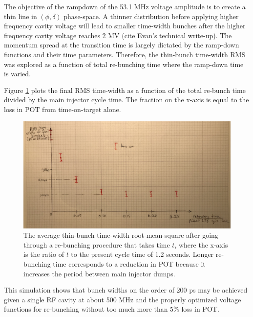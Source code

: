 The objective of the rampdown of the 53.1 MHz voltage amplitude is to
create a thin line in $(\phi, \delta)$ phase-space. A thinner
distribution before applying higher frequency cavity voltage will lead
to smaller time-width bunches after the higher frequency cavity
voltage reaches 2 MV (cite Evan's technical write-up). The momentum spread at the transition
time is largely dictated by the ramp-down functions and their time
parameters. Therefore, the thin-bunch time-width RMS was explored as a
function of total re-bunching time where the ramp-down time is varied.

Figure \ref{fig:bunch_width_curve} plots the final RMS time-width as a
function of the total re-bunch time divided by the main injector cycle
time. The fraction on the x-axis is equal to the loss in POT from
time-on-target alone.

\begin{figure}[h!]
	\begin{center}
        \includegraphics[width=0.60\linewidth]{Figures/draft_rms_vs_time.JPG}
	\end{center}
	\caption{The average thin-bunch time-width root-mean-square after going through a
          re-bunching procedure that takes time $t$, where the x-axis
          is the ratio of $t$ to the present cycle time of $1.2$
          seconds. Longer re-bunching time corresponds to a reduction
          in POT because it increases the period between main injector
          dumps.}
		\label{fig:bunch_width_curve}
\end{figure}

This simulation shows that bunch widths on the order of 200 ps may be
achieved given a single RF cavity at about 500 MHz and the properly
optimized voltage functions for re-bunching without too much more than
5\% loss in POT.

